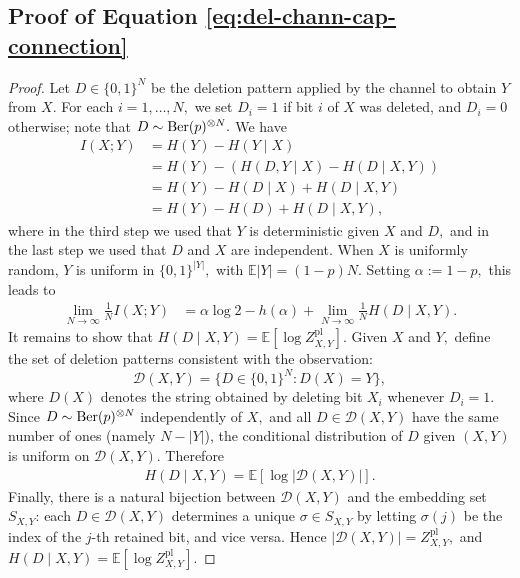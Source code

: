 \documentclass[11pt]{amsart}
\numberwithin{equation}{section}
\numberwithin{equation}{section}
\newcommand{\1}{\mathbbm{1}}
\newcommand{\E}{\mathbb{E}}
\newcommand{\Ber}{\textup{Ber}}
\theoremstyle{definition}
\begin{document}
\begin{appendices}

\appendix

\section{\texorpdfstring{Proof of Equation \eqref{eq:del-chann-cap-connection}}{Proof of Capacity Identity}} \label{app:del-chann-cap-proof}

\begin{proof}
Let $D \in \{0,1\}^N$ be the deletion pattern applied by the channel to obtain $Y$ from $X.$ For each $i=1,\dots,N,$ we set $D_i=1$ if bit $i$ of $X$ was deleted, and $D_i=0$ otherwise; note that $D\sim \Ber(p)^{\otimes N}.$ We have
\begin{align*}
    I(X;Y) &= H(Y) - H(Y \mid X) \\
    &= H(Y) - (H(D,Y \mid X) - H(D \mid X,Y)) \\
    &= H(Y) - H(D \mid X) + H(D \mid X,Y) \\
    &= H(Y) - H(D) + H(D \mid X,Y),
\end{align*}
where in the third step we used that $Y$ is deterministic given $X$ and $D,$ and in the last step we used that $D$ and $X$ are independent. When $X$ is uniformly random, $Y$ is uniform in $\{0,1\}^{|Y|},$ with $\E |Y| =(1-p)N.$ Setting $\alpha := 1-p,$ this leads to
\begin{align*}
    \lim_{N\to \infty} \frac{1}{N}I(X;Y) &= \alpha \log 2 - h(\alpha) + \lim_{N\to\infty} \frac{1}{N}H(D \mid X,Y).
\end{align*}
It remains to show that $H(D \mid X,Y) = \E[\log Z_{X,Y}^{\mathrm{pl}}]$. Given $X$ and $Y,$ define the set of deletion patterns consistent with the observation:
\[
\mathcal{D}(X,Y) = \{D \in \{0,1\}^N : D(X) = Y\},
\]
where $D(X)$ denotes the string obtained by deleting bit $X_i$ whenever $D_i = 1.$ Since $D \sim \Ber(p)^{\otimes N}$ independently of $X,$ and all $D \in \mathcal{D}(X,Y)$ have the same number of ones (namely $N - |Y|$), the conditional distribution of $D$ given $(X,Y)$ is uniform on $\mathcal{D}(X,Y).$ Therefore 
\begin{align*}
    H(D \mid X,Y) = \E[\log |\mathcal{D}(X,Y)|].
\end{align*}
Finally, there is a natural bijection between $\mathcal{D}(X,Y)$ and the embedding set $S_{X,Y}$: each $D \in \mathcal{D}(X,Y)$ determines a unique $\sigma \in S_{X,Y}$ by letting $\sigma(j)$ be the index of the $j$-th retained bit, and vice versa. Hence $|\mathcal{D}(X,Y)| = Z_{X,Y}^{\mathrm{pl}},$ and $H(D \mid X,Y) = \E[\log Z_{X,Y}^{\mathrm{pl}}]$.


\end{proof}
\end{appendices}
\end{document}
